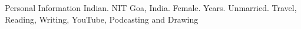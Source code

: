 \begin{rubric}{Personal Information}
\entry*[Nationality]
	Indian.
	NIT Goa, India.
\entry*[Gender]
	Female.
 Years.	
	Unmarried.	
\entry*[Hobbies]
	Travel, Reading, Writing, YouTube, Podcasting and Drawing	

\end{rubric}
